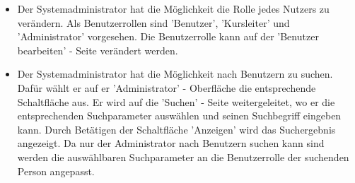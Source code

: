 \documentclass[a4paper]{scrreprt}
\begin{document}
\begin{itemize}
				\item {}
					Der Systemadministrator hat die Möglichkeit die Rolle jedes Nutzers zu verändern. Als Benutzerrollen sind 'Benutzer', 'Kursleiter' und 'Administrator' vorgesehen. Die Benutzerrolle kann auf der 'Benutzer bearbeiten' - Seite verändert werden.
				\item {}
					Der Systemadministrator hat die Möglichkeit nach Benutzern zu suchen. Dafür wählt er auf er 'Administrator' - Oberfläche die entsprechende Schaltfläche aus. Er wird auf die 'Suchen' - Seite weitergeleitet, wo er die entsprechenden Suchparameter auswählen und seinen Suchbegriff eingeben kann. Durch Betätigen der Schaltfläche 'Anzeigen' wird das Suchergebnis angezeigt. Da nur der Administrator nach Benutzern suchen kann sind werden die auswählbaren Suchparameter an die Benutzerrolle der suchenden Person angepasst.
			\end{itemize}
\end{document}
